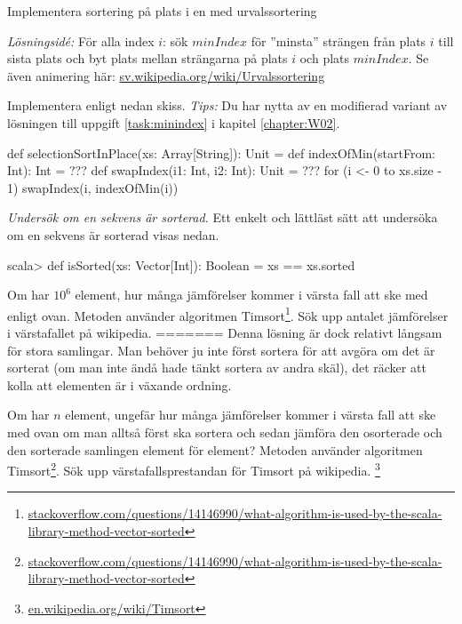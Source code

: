 \Task Implementera sortering på plats  i en  med urvalssortering  

\emph{Lösningsidé:} För alla index $i$: sök $minIndex$ för ''minsta'' strängen från plats $i$ till sista plats och byt plats mellan strängarna på plats $i$ och plats $minIndex$. Se även animering här: \href{https://sv.wikipedia.org/wiki/Urvalssortering}{sv.wikipedia.org/wiki/Urvalssortering}

Implementera enligt nedan skiss.  \emph{Tips:} Du har nytta av en modifierad variant av lösningen till uppgift \ref{task:minindex} i kapitel \ref{chapter:W02}.
\begin{Code}
def selectionSortInPlace(xs: Array[String]): Unit = {
  def indexOfMin(startFrom: Int): Int = ??? 
  def swapIndex(i1: Int, i2: Int): Unit = ???
  for (i <- 0 to xs.size - 1) swapIndex(i, indexOfMin(i))
}
\end{Code} 




\ExtraTasks %

\Task \label{task:isSorted} \emph{Undersök om en sekvens är sorterad.} Ett enkelt och lättläst sätt att undersöka om en sekvens är sorterad visas nedan. 
\begin{REPL}
scala> def isSorted(xs: Vector[Int]): Boolean = xs == xs.sorted
\end{REPL}


\Subtask\Pen  Om  har $10^6$ element, hur många jämförelser kommer i värsta fall att ske med  enligt ovan. Metoden  använder algoritmen Timsort\footnote{\href{http://stackoverflow.com/questions/14146990/what-algorithm-is-used-by-the-scala-library-method-vector-sorted}{stackoverflow.com/questions/14146990/what-algorithm-is-used-by-the-scala-library-method-vector-sorted}}. Sök upp antalet jämförelser i värstafallet på wikipedia.%
=======
Denna lösning är dock relativt långsam för stora samlingar. Man behöver ju inte först sortera  för att avgöra om det är sorterat (om man inte ändå hade tänkt sortera av andra skäl), det räcker att kolla att elementen är i växande ordning.

\Subtask\Pen  Om  har $n$ element, ungefär hur många jämförelser kommer i värsta fall att ske med  ovan om man alltså först ska sortera och sedan jämföra den osorterade och den sorterade samlingen element för element? Metoden  använder algoritmen Timsort\footnote{\href{http://stackoverflow.com/questions/14146990/what-algorithm-is-used-by-the-scala-library-method-vector-sorted}{stackoverflow.com/questions/14146990/what-algorithm-is-used-by-the-scala-library-method-vector-sorted}}. Sök upp värstafallsprestandan för Timsort på wikipedia.
\footnote{\href{https://en.wikipedia.org/wiki/Timsort}{en.wikipedia.org/wiki/Timsort}}

